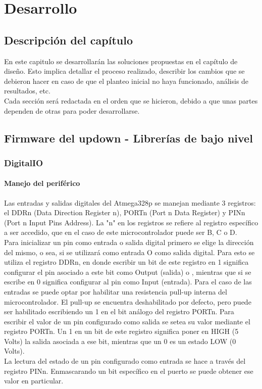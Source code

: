 \chapter{Desarrollo}
\thispagestyle{empty}

\section{Descripción del capítulo} \label{sec:\thesection}
En este capitulo se desarrollarán las soluciones propuestas en el capítulo de diseño. Esto implica detallar el proceso realizado, describir los cambios que se debieron hacer en caso de que el planteo inicial no haya funcionado, análisis de resultados, etc. \\
Cada sección será redactada en el orden que se hicieron, debido a que unas partes dependen de otras para poder desarrollarse.

\section{Firmware del updown - Librerías de bajo nivel} \label{sec:\thesection}

\subsection{DigitalIO}

\subsubsection{Manejo del periférico}

Las entradas y salidas digitales del Atmega328p se manejan mediante 3 registros: el DDRn (Data Direction Register n), PORTn (Port n Data Register) y PINn (Port n Input Pins Address). La "n" en los registros se refiere al registro específico a ser accedido, que en el caso de este microcontrolador puede ser B, C o D.\\

Para inicializar un pin como entrada o salida digital primero se elige la dirección del mismo, o sea, si se utilizará como entrada O como salida digital. Para esto se utiliza el registro DDRn, en donde escribir un bit de este registro en 1 significa configurar el pin asociado a este bit como Output (salida) o , mientras que si se escribe en 0 significa configurar al pin como Input (entrada). Para el caso de las entradas se puede optar por habilitar una resistencia pull-up interna del microcontrolador. El pull-up se encuentra deshabilitado por defecto, pero puede ser habilitado escribiendo un 1 en el bit análogo del registro PORTn.
Para escribir el valor de un pin configurado como salida se setea su valor mediante el registro PORTn. Un 1 en un bit de este registro significa poner en HIGH (5 Volts) la salida asociada a ese bit, mientras que un 0 es un estado LOW (0 Volts).\\
La lectura del estado de un pin configurado como entrada se hace a través del registro PINn. Enmascarando un bit específico en el puerto se puede obtener ese valor en particular.

